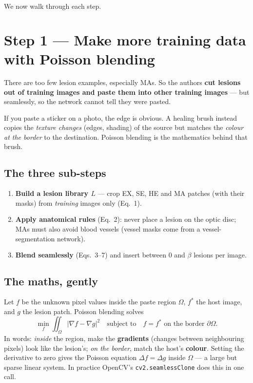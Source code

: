 \documentclass[11pt,a4paper]{article}
\begin{document}
We now walk through each step.

\section{Step 1 --- Make more training data with Poisson blending}
\begin{idea}
There are too few lesion examples, especially MAs. So the authors \textbf{cut lesions out of
training images and paste them into other training images} --- but seamlessly, so the network cannot
tell they were pasted.
\end{idea}

\begin{analogy}
If you paste a sticker on a photo, the edge is obvious. A healing brush instead copies the
\emph{texture changes} (edges, shading) of the source but matches the \emph{colour at the border}
to the destination. Poisson blending is the mathematics behind that brush.
\end{analogy}

\subsection*{The three sub-steps}
\begin{enumerate}
\item \textbf{Build a lesion library $L$} --- crop EX, SE, HE and MA patches (with their masks) from
      \emph{training} images only (Eq.~1).
\item \textbf{Apply anatomical rules} (Eq.~2): never place a lesion on the optic disc; MAs must also
      avoid blood vessels (vessel masks come from a vessel-segmentation network).
\item \textbf{Blend seamlessly} (Eqs.~3--7) and insert between $0$ and $\beta$ lesions per image.
\end{enumerate}

\subsection*{The maths, gently}
Let $f$ be the unknown pixel values inside the paste region $\Omega$, $f^*$ the host image, and $g$
the lesion patch. Poisson blending solves
\[
\min_f \iint_{\Omega} \lvert \nabla f - \nabla g \rvert^2 \quad\text{subject to}\quad f=f^* \text{ on the border } \partial\Omega .
\]
In words: \emph{inside} the region, make the \textbf{gradients} (changes between neighbouring pixels)
look like the lesion's; \emph{on the border}, match the host's \textbf{colour}. Setting the derivative
to zero gives the Poisson equation $\Delta f=\Delta g$ inside $\Omega$ --- a large but sparse linear
system. In practice OpenCV's \texttt{cv2.seamlessClone} does this in one call.
\end{document}
